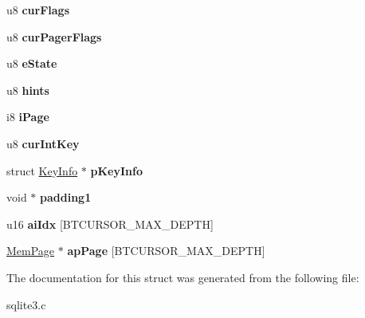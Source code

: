 \begin{DoxyCompactItemize}
\item 
u8 {\bfseries cur\+Flags}\hypertarget{structBtCursor_ab120d81b3550eabce37f377cbdae8836}{}\label{structBtCursor_ab120d81b3550eabce37f377cbdae8836}

\item 
u8 {\bfseries cur\+Pager\+Flags}\hypertarget{structBtCursor_aff2ef1cec10fbfc0c2d35277b5ee4432}{}\label{structBtCursor_aff2ef1cec10fbfc0c2d35277b5ee4432}

\item 
u8 {\bfseries e\+State}\hypertarget{structBtCursor_a30ab5e7109965b34a08562a7b7e6de15}{}\label{structBtCursor_a30ab5e7109965b34a08562a7b7e6de15}

\item 
u8 {\bfseries hints}\hypertarget{structBtCursor_ad8c66c31cf1a2c2181d61a64ca951a8a}{}\label{structBtCursor_ad8c66c31cf1a2c2181d61a64ca951a8a}

\item 
i8 {\bfseries i\+Page}\hypertarget{structBtCursor_adfe516b0ae2c030f5963fda944bf6d8e}{}\label{structBtCursor_adfe516b0ae2c030f5963fda944bf6d8e}

\item 
u8 {\bfseries cur\+Int\+Key}\hypertarget{structBtCursor_a37db7ea50e0f355ea6a3d8d3213722c3}{}\label{structBtCursor_a37db7ea50e0f355ea6a3d8d3213722c3}

\item 
struct \hyperlink{structKeyInfo}{Key\+Info} $\ast$ {\bfseries p\+Key\+Info}\hypertarget{structBtCursor_ad2360bda13f959ed70672eb421fdb5ec}{}\label{structBtCursor_ad2360bda13f959ed70672eb421fdb5ec}

\item 
void $\ast$ {\bfseries padding1}\hypertarget{structBtCursor_ac4321376ea6d26d2aa7f7cc905e09310}{}\label{structBtCursor_ac4321376ea6d26d2aa7f7cc905e09310}

\item 
u16 {\bfseries ai\+Idx} \mbox{[}B\+T\+C\+U\+R\+S\+O\+R\+\_\+\+M\+A\+X\+\_\+\+D\+E\+P\+TH\mbox{]}\hypertarget{structBtCursor_a037a739198de5bee22ca203d34e90af1}{}\label{structBtCursor_a037a739198de5bee22ca203d34e90af1}

\item 
\hyperlink{structMemPage}{Mem\+Page} $\ast$ {\bfseries ap\+Page} \mbox{[}B\+T\+C\+U\+R\+S\+O\+R\+\_\+\+M\+A\+X\+\_\+\+D\+E\+P\+TH\mbox{]}\hypertarget{structBtCursor_ad3414d944f9578e86e26c6158f92096b}{}\label{structBtCursor_ad3414d944f9578e86e26c6158f92096b}

\end{DoxyCompactItemize}


The documentation for this struct was generated from the following file\+:\begin{DoxyCompactItemize}
\item 
sqlite3.\+c\end{DoxyCompactItemize}
